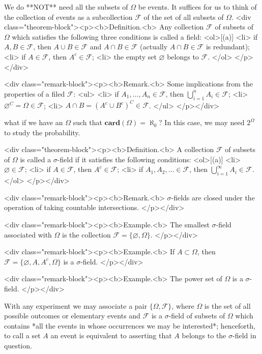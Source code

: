 We do **NOT** need all the subsets of $\Omega$ be events. It suffices for us to think of the collection of events as a subcollection $\mathcal{F}$ of the set of all subsets of $\Omega$.
<div class="theorem-block"><p><b>Definition.<b> 
Any collection $\mathcal{F}$ of subsets of $\Omega$ which satisfies the following three conditions is called a field:
<ol>[(a)]
    <li> if $A, B \in \mathcal{F}$, then $A \cup B \in \mathcal{F}$ and $A \cap B \in \mathcal{F}$ (actually $A\cap B \in \mathcal{F}$ is redundant); 
    <li> if $A \in \mathcal{F}$, then $A^c \in \mathcal{F}$;
    <li> the empty set $\varnothing$ belongs to $\mathcal{F}$.
</ol>
</p></div>

<div class="remark-block"><p><b>Remark.<b> 
Some implications from the properties of a filed $\mathcal{F}$:
<ul>
    <li> if $A_1, \dots, A_n \in \mathcal{F}$, then $\bigcup_{i=1}^n A_i \in \mathcal{F}$;
    <li> $\varnothing^C = \Omega \in \mathcal{F}$;
    <li> $A \cap B = (A^c \cup B^c)^C \in \mathcal{F}$.
</ul>
</p></div>

\begin{question}
what if we have an $\Omega$ such that $\mathbf{card}(\Omega) = \aleph_0$? In this case, we may need $2^\Omega$ to study the probability. 
\end{question}

<div class="theorem-block"><p><b>Definition.<b> 
A collection $\mathcal{F}$ of subsets of $\Omega$ is called a $\sigma$-field if it satisfies the following conditions: 
<ol>[(a)]
    <li> $\varnothing \in \mathcal{F}$;
    <li> if $A \in \mathcal{F}$, then $A^c \in \mathcal{F}$;
    <li> if $A_1, A_2, \dots \in \mathcal{F}$, then $\bigcup_{i=1}^\infty A_i \in \mathcal{F}$.
</ol>
</p></div>

<div class="remark-block"><p><b>Remark.<b> 
$\sigma$-fields are closed under the operation of taking countable intersections.
</p></div>

<div class="remark-block"><p><b>Example.<b> 
The smallest $\sigma$-field associated with $\Omega$ is the collection $\mathcal{F} = \{\varnothing, \Omega \}$.
</p></div>

<div class="remark-block"><p><b>Example.<b> 
If $A \subset \Omega$, then $\mathcal{F} = \{\varnothing, A, A^c, \Omega \}$ is a $\sigma$-field. 
</p></div>

<div class="remark-block"><p><b>Example.<b> 
The power set of $\Omega$ is a $\sigma$-field.
</p></div>

With any experiment we may associate a pair $\{\Omega, \mathcal{F}\}$, where $\Omega$ is the set of all possible outcomes or elementary events and $\mathcal{F}$ is a $\sigma$-field of subsets of $\Omega$ which contains *all the events in whose occurrences we may be interested*; henceforth, to call a set $A$ an event is equivalent to asserting that $A$ belongs to the $\sigma$-field in question. 


